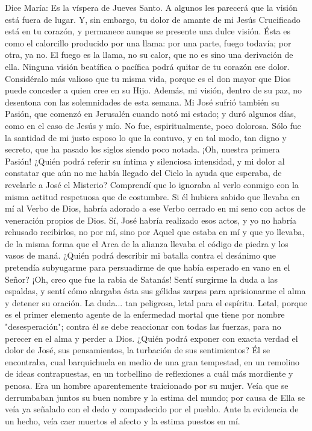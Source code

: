 \documentclass[12pt]{book} %
\begin{document}
Dice María: 
Es la víspera de Jueves Santo. A algunos les parecerá que la visión está fuera de lugar. Y, sin embargo, tu dolor de 
amante de mi Jesús Crucificado está en tu corazón, y permanece aunque se presente una dulce visión. Ésta es como el calorcillo producido por una llama: por una parte, fuego todavía; por otra, ya no. El fuego es la llama, no su calor, que no es sino una derivación de ella. Ninguna visión beatífica o pacífica podrá quitar de tu corazón ese dolor. Considéralo más valioso que tu misma vida, porque es el don mayor que Dios puede conceder a quien cree en su Hijo. Además, mi visión, dentro de su paz, no desentona con las solemnidades de esta semana. 
Mi José sufrió también su Pasión, que comenzó en Jerusalén cuando notó mi estado; y duró algunos días, como en el 
caso de Jesús y mío. No fue, espiritualmente, poco dolorosa. Sólo fue la santidad de mi justo esposo lo que la contuvo, y en tal modo, tan digno y secreto, que ha pasado los siglos siendo poco notada. 
¡Oh, nuestra primera Pasión! ¿Quién podrá referir su íntima y silenciosa intensidad, y mi dolor al constatar que aún no 
me había llegado del Cielo la ayuda que esperaba, de revelarle a José el Misterio? 
Comprendí que lo ignoraba al verlo conmigo con la misma actitud respetuosa que de costumbre. Si él hubiera sabido 
que llevaba en mí al Verbo de Dios, habría adorado a ese Verbo cerrado en mi seno con actos de veneración propios de Dios. Sí, José habría realizado esos actos, y yo no habría rehusado recibirlos, no por mí, sino por Aquel que estaba en mí y que yo llevaba, de la misma forma que el Arca de la alianza llevaba el código de piedra y los vasos de maná. 
¿Quién podrá describir mi batalla contra el desánimo que pretendía subyugarme para persuadirme de que había esperado en vano en el Señor? ¡Oh, creo que fue la rabia de Satanás! Sentí surgirme la duda a las espaldas, y sentí cómo alargaba ésta sus gélidas zarpas para aprisionarme el alma y detener su oración. La duda... tan peligrosa, letal para el espíritu. Letal, porque es el primer elemento agente de la enfermedad mortal que tiene por nombre "desesperación"; contra él se debe reaccionar con todas las fuerzas, para no perecer en el alma y perder a Dios. 
¿Quién podrá exponer con exacta verdad el dolor de José, sus pensamientos, la turbación de sus sentimientos? Él se encontraba, cual barquichuela en medio de una gran tempestad, en un remolino de ideas contrapuestas, en un torbellino de reflexiones a cuál más mordiente y penosa. Era un hombre aparentemente traicionado por su mujer. Veía que se derrumbaban juntos su buen nombre y la estima del mundo; por causa de Ella se veía ya señalado con el dedo y compadecido por el pueblo. Ante la evidencia de un hecho, veía caer muertos el afecto y la estima puestos en mí. 
\end{document}
